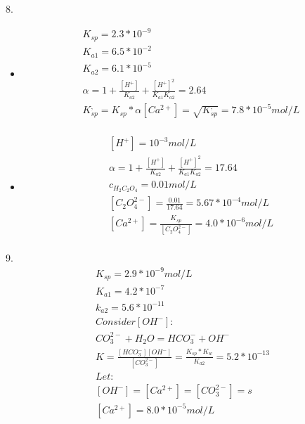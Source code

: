\documentclass{article}
\begin{document}
8.\begin{itemize}
    \item 
    \begin{equation}
        \begin{multlined}
            K_{sp} = 2.3*10^{-9}\\
            K_{a1} = 6.5*10^{-2}\\
            K_{a2} = 6.1*10^{-5}\\
            \alpha = 1 + \frac{[H^+]}{K_{a2}} + \frac{[H^+]^2}{K_{a1}K_{a2}} = 2.64\\
            K^,_{sp} = K_{sp}*\alpha
            [Ca^{2+}] =\sqrt{K^,_{sp}} = 7.8*10^{-5} mol/L\\
        \end{multlined}
    \end{equation}
    \item
    \begin{equation}
        \begin{multlined}
            [H^+] = 10^{-3} mol/L\\
            \alpha = 1 + \frac{[H^+]}{K_{a2}} + \frac{[H^+]^2}{K_{a1}K_{a2}} = 17.64\\
            c_{H_2C_2O_4} = 0.01 mol/L\\
            [C_2O_4^{2-}] = \frac{0.01}{17.64} = 5.67*10^{-4} mol/L\\
            [Ca^{2+}] = \frac{K_{sp}}{[C_2O_4^{2-}]} = 4.0*10^{-6} mol/L\\
        \end{multlined}
    \end{equation}
\end{itemize}
9.\begin{equation}
    \begin{multlined}
        K_{sp} = 2.9*10^{-9} mol/L\\
        K_{a1} = 4.2*10^{-7}\\
        k_{a2} = 5.6*10^{-11}\\
        Consider [OH^-]:\\
        CO_3^{2-} + H_2O = HCO_3^- + OH^-\\
        K = \frac{[HCO_3^-][OH^-]}{[CO_3^{2-}]} = \frac{K_{sp}*K_w}{K_{a2}} = 5.2*10^{-13}\\
        Let:\\
        [OH^-] = [Ca^{2+}] = [CO_3^{2-}] = s\\
        [Ca^{2+}] = 8.0*10^{-5} mol/L\\
    \end{multlined}
\end{equation}
\end{document}
